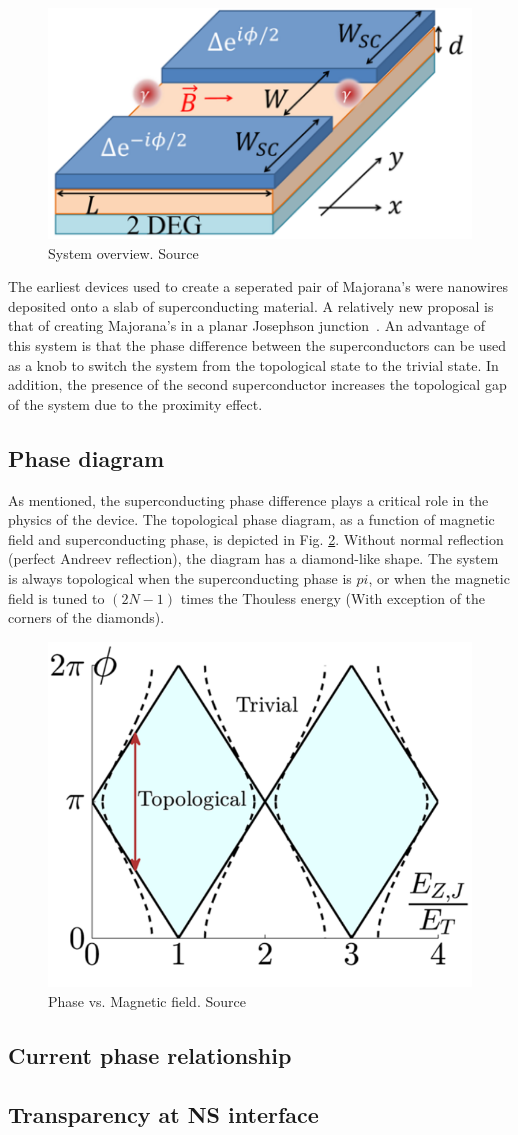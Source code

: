 	\begin{figure}[!htb]
	\centering
	\includegraphics[width=0.5\columnwidth]{figures/pientka_system}
	\caption{System overview. Source\cite{pientka_topological_2017}}
	\label{fig:pientka_system}
	\end{figure}

	The earliest devices used to create a seperated pair of Majorana's were nanowires deposited onto a slab of superconducting material.
	A relatively new proposal is that of creating Majorana's in a planar Josephson junction~\cite{pientka_topological_2017}.
	An advantage of this system is that the phase difference between the superconductors can be used as a knob to switch the system from the topological state to the trivial state. 
	In addition, the presence of the second superconductor increases the topological gap of the system due to the proximity effect.

			

	\subsection{Phase diagram}
	As mentioned, the superconducting phase difference plays a critical role in the physics of the device.
	The topological phase diagram, as a function of magnetic field and superconducting phase, is depicted in Fig. \ref{fig:pientka_phase_diagram}.
	Without normal reflection (perfect Andreev reflection), the diagram has a diamond-like shape.
	The system is always topological when the superconducting phase is $pi$, or when the magnetic field is tuned to $(2N-1)$ times the Thouless energy (With exception of the corners of the diamonds).
	
	\begin{figure}[!htb]
	\centering
	\includegraphics[width=0.5\columnwidth]{figures/pientka_phase_diagram}
	\caption{Phase vs. Magnetic field. Source\cite{pientka_topological_2017}}
	\label{fig:pientka_phase_diagram}
	\end{figure}
	

	\subsection{Current phase relationship}
	
	
	\subsection{Transparency at NS interface}
